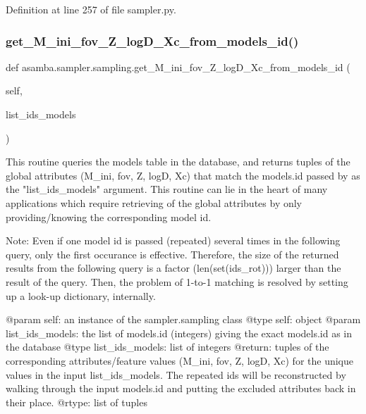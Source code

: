 Definition at line 257 of file sampler.\+py.

\mbox{\label{classasamba_1_1sampler_1_1sampling_a64ed2afa6e77447a36512136da5b500a}} 
\subsubsection{\texorpdfstring{get\+\_\+\+M\+\_\+ini\+\_\+fov\+\_\+\+Z\+\_\+log\+D\+\_\+\+Xc\+\_\+from\+\_\+models\+\_\+id()}{get\_M\_ini\_fov\_Z\_logD\_Xc\_from\_models\_id()}}
{\footnotesize\ttfamily def asamba.\+sampler.\+sampling.\+get\+\_\+\+M\+\_\+ini\+\_\+fov\+\_\+\+Z\+\_\+log\+D\+\_\+\+Xc\+\_\+from\+\_\+models\+\_\+id (\begin{DoxyParamCaption}\item[{}]{self,  }\item[{}]{list\+\_\+ids\+\_\+models }\end{DoxyParamCaption})}

\begin{DoxyVerb}This routine queries the models table in the database, and returns tuples of the global attributes
(M_ini, fov, Z, logD, Xc) that match the models.id passed by as the "list_ids_models" argument.
This routine can lie in the heart of many applications which require retrieving of the global attributes
by only providing/knowing the corresponding model id.

Note: Even if one model id is passed (repeated) several times in the following query, only the first
occurance is effective. Therefore, the size of the returned results from the following query
is a factor (len(set(ids_rot))) larger than the result of the query. Then, the problem of 1-to-1
matching is resolved by setting up a look-up dictionary, internally.

@param self: an instance of the sampler.sampling class
@type self: object
@param list_ids_models: the list of models.id (integers) giving the exact models.id as in the database
@type list_ids_models: list of integers
@return: tuples of the corresponding attributes/feature values (M_ini, fov, Z, logD, Xc) for the unique
  values in the input list_ids_models. The repeated ids will be reconstructed by walking through the
  input models.id and putting the excluded attributes back in their place.
@rtype: list of tuples
\end{DoxyVerb}
 

